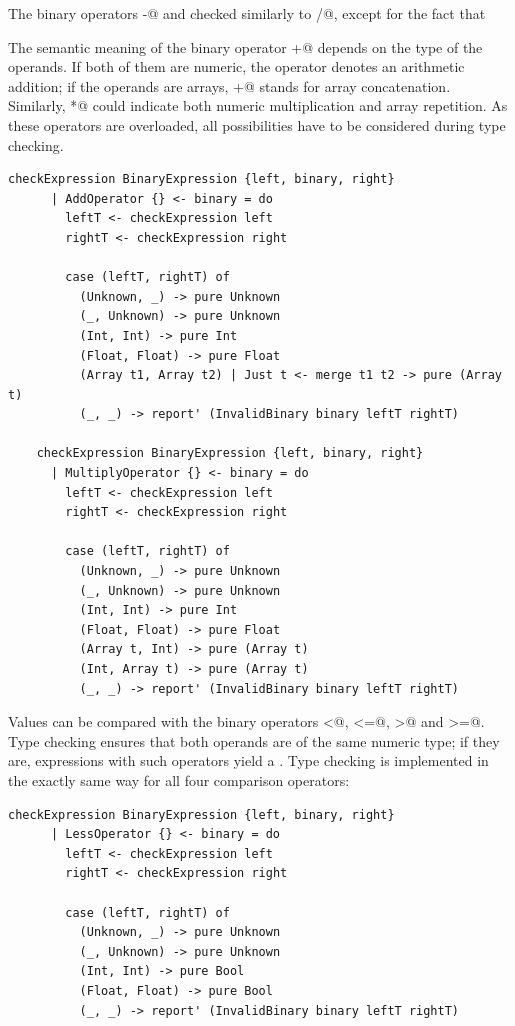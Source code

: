 \documentclass[UdineBachThesis,american,11pt]{PhdThesis}
\begin{document}
  The binary operators \lstinline@-@ and \lstinline@%@ are type
  checked similarly to \lstinline@/@, except for the fact that
  \lstinline@%@ only accepts operands of type \lstinline@Int@.

  The semantic meaning of the binary operator \lstinline@+@ depends on the type
  of the operands. If both of them are numeric, the operator denotes an
  arithmetic addition; if the operands are arrays, \lstinline@+@ stands for
  array concatenation. Similarly, \lstinline@*@ could indicate both numeric
  multiplication and array repetition. As these operators are overloaded, all
  possibilities have to be considered during type checking.

  \begin{lstlisting}[gobble=4,basicstyle=\ttfamily\small]
    checkExpression BinaryExpression {left, binary, right}
      | AddOperator {} <- binary = do
        leftT <- checkExpression left
        rightT <- checkExpression right

        case (leftT, rightT) of
          (Unknown, _) -> pure Unknown
          (_, Unknown) -> pure Unknown
          (Int, Int) -> pure Int
          (Float, Float) -> pure Float
          (Array t1, Array t2) | Just t <- merge t1 t2 -> pure (Array t)
          (_, _) -> report' (InvalidBinary binary leftT rightT)

    checkExpression BinaryExpression {left, binary, right}
      | MultiplyOperator {} <- binary = do
        leftT <- checkExpression left
        rightT <- checkExpression right

        case (leftT, rightT) of
          (Unknown, _) -> pure Unknown
          (_, Unknown) -> pure Unknown
          (Int, Int) -> pure Int
          (Float, Float) -> pure Float
          (Array t, Int) -> pure (Array t)
          (Int, Array t) -> pure (Array t)
          (_, _) -> report' (InvalidBinary binary leftT rightT)
  \end{lstlisting}

  Values can be compared with the binary operators \lstinline@<@,
  \lstinline@<=@, \lstinline@>@ and \lstinline@>=@. Type checking ensures that
  both operands are of the same numeric type; if they are, expressions with such
  operators yield a \lstinline@Bool@. Type checking is implemented in the
  exactly same way for all four comparison operators:

  \begin{lstlisting}[gobble=4,basicstyle=\ttfamily\small]
    checkExpression BinaryExpression {left, binary, right}
      | LessOperator {} <- binary = do
        leftT <- checkExpression left
        rightT <- checkExpression right

        case (leftT, rightT) of
          (Unknown, _) -> pure Unknown
          (_, Unknown) -> pure Unknown
          (Int, Int) -> pure Bool
          (Float, Float) -> pure Bool
          (_, _) -> report' (InvalidBinary binary leftT rightT)
  \end{lstlisting}
\end{document}
